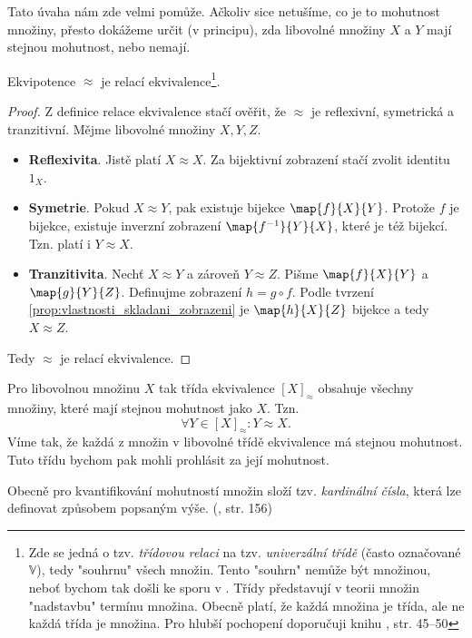 Tato úvaha nám zde velmi pomůže. Ačkoliv sice netušíme, co je to mohutnost množiny, přesto dokážeme určit (v principu), zda libovolné množiny $X$ a $Y$ mají stejnou mohutnost, nebo nemají.
\begin{lemma}
    Ekvipotence $\approx$ je relací ekvivalence\footnote{Zde se jedná o tzv. \emph{třídovou relaci} na tzv. \emph{univerzální třídě} (často označované $\mathbb{V}$), tedy "souhrnu" všech množin. Tento "souhrn" nemůže být množinou, neboť bychom tak došli ke sporu v \ZF{}. Třídy představují v teorii množin "nadstavbu" termínu množina. Obecně platí, že každá množina je třída, ale ne každá třída je množina. Pro hlubší pochopení doporučuji knihu \cite{BalcarStepanek1986}, str. 45--50}.
\end{lemma}
\begin{proof}
    Z definice relace ekvivalence stačí ověřit, že $\approx$ je reflexivní, symetrická a tranzitivní. Mějme libovolné množiny $X,Y,Z$.
    \begin{itemize}
        \item \textbf{Reflexivita}. Jistě platí $X\approx X$. Za bijektivní zobrazení stačí zvolit identitu $1_X$.
        \item \textbf{Symetrie}. Pokud $X\approx Y$, pak existuje bijekce $\map{f}{X}{Y}$. Protože $f$ je bijekce, existuje inverzní zobrazení $\map{f^{-1}}{Y}{X}$, které je též bijekcí. Tzn. platí i $Y\approx X$.
        \item \textbf{Tranzitivita}. Nechť $X\approx Y$ a zároveň $Y\approx Z$. Pišme $\map{f}{X}{Y}$ a $\map{g}{Y}{Z}$. Definujme zobrazení $h=g\circ f$. Podle tvrzení \ref{prop:vlastnosti_skladani_zobrazeni} je $\map{h}{X}{Z}$ bijekce a tedy $X\approx Z$.
    \end{itemize}
    Tedy $\approx$ je relací ekvivalence.
\end{proof}
Pro libovolnou množinu $X$ tak třída ekvivalence $[X]_\approx$ obsahuje všechny množiny, které mají stejnou mohutnost jako $X$. Tzn.
\begin{equation*}
    \forall Y\in [X]_\approx: Y\approx X.
\end{equation*}
Víme tak, že každá z množin v libovolné třídě ekvivalence má stejnou mohutnost. Tuto třídu bychom pak mohli prohlásit za její mohutnost.\par
Obecně pro kvantifikování mohutností množin složí tzv. \emph{kardinální čísla}, která lze definovat způsobem popsaným výše. (\cite{Potter2009}, str. 156) 